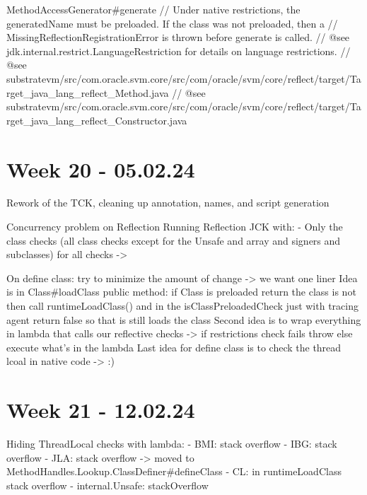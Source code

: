 MethodAccessGenerator#generate
// Under native restrictions, the generatedName must be preloaded. If the class was not preloaded, then a
// MissingReflectionRegistrationError is thrown before generate is called.
// @see jdk.internal.restrict.LanguageRestriction for details on language restrictions.
// @see substratevm/src/com.oracle.svm.core/src/com/oracle/svm/core/reflect/target/Target_java_lang_reflect_Method.java
// @see substratevm/src/com.oracle.svm.core/src/com/oracle/svm/core/reflect/target/Target_java_lang_reflect_Constructor.java
\section{Week 20 - 05.02.24}

Rework of the TCK, cleaning up annotation, names, and script generation

Concurrency problem on Reflection
Running Reflection JCK with:
 - Only the class checks (all class checks except for the Unsafe and array and signers and subclasses) for all checks ->

On define class:
try to minimize the amount of change -> we want one liner
Idea is in Class#loadClass public method: if Class is preloaded return the class is not then call runtimeLoadClass() and in the isClassPreloadedCheck just with tracing agent return false so that is still loads the class
Second idea is to wrap everything in lambda that calls our reflective checks -> if restrictions check fails throw else execute what's in the lambda
Last idea for define class is to check the thread lcoal in native code -> :)

\section{Week 21 - 12.02.24}

Hiding ThreadLocal checks with lambda:
- BMI: stack overflow
- IBG: stack overflow
- JLA: stack overflow -> moved to MethodHandles.Lookup.ClassDefiner#defineClass
- CL: in runtimeLoadClass stack overflow
- internal.Unsafe: stackOverflow


